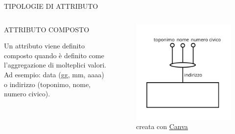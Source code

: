 \documentclass[aspectratio=1610]{beamer}
\begin{document}
\begin{frame}{TIPOLOGIE DI ATTRIBUTO}
    \begin{columns}
            \begin{alertblock}{ATTRIBUTO COMPOSTO}
                \begin{minipage}{0.96\linewidth}
                    \justifying
                    Un attributo viene definito composto quando è definito come l’aggregazione 
                    di molteplici valori. Ad esempio: data (gg, mm, aaaa) o indirizzo (toponimo, 
                    nome, numero civico).\\
                    \bigskip
                \end{minipage}
            \end{alertblock}
            \begin{figure}
                \includegraphics[width=\linewidth]{img/attributo_composto.png}
                \caption{{creata con \href{www.canva.com}{Canva}}}
            \end{figure}
    \end{columns}
\end{frame}
\end{document}
